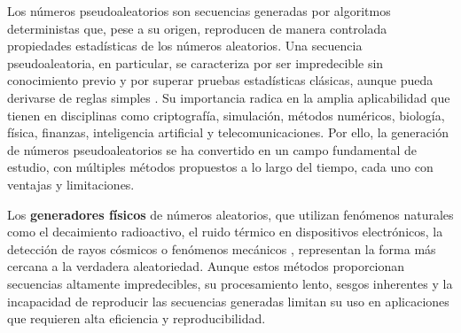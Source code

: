 \documentclass[../Main.tex]{subfiles}
\begin{document}


Los números pseudoaleatorios son secuencias generadas por algoritmos deterministas que, pese a su origen, reproducen de manera controlada propiedades estadísticas de los números aleatorios. Una secuencia pseudoaleatoria, en particular, se caracteriza por ser impredecible sin conocimiento previo y por superar pruebas estadísticas clásicas, aunque pueda derivarse de reglas simples \cite{Lehmer1951}. Su importancia radica en la amplia aplicabilidad que tienen en disciplinas como criptografía, simulación, métodos numéricos, biología, física, finanzas, inteligencia artificial y telecomunicaciones. Por ello, la generación de números pseudoaleatorios se ha convertido en un campo fundamental de estudio, con múltiples métodos propuestos a lo largo del tiempo, cada uno con ventajas y limitaciones.

Los \textbf{generadores físicos} de números aleatorios, que utilizan fenómenos naturales como el decaimiento radioactivo, el ruido térmico en dispositivos electrónicos, la detección de rayos cósmicos o fenómenos mecánicos  \cite{Madiot2022,Stipcevic2014}, representan la forma más cercana a la verdadera aleatoriedad. Aunque estos métodos proporcionan secuencias altamente impredecibles, su procesamiento lento, sesgos inherentes y la incapacidad de reproducir las secuencias generadas limitan su uso en aplicaciones que requieren alta eficiencia y reproducibilidad.
\end{document}
